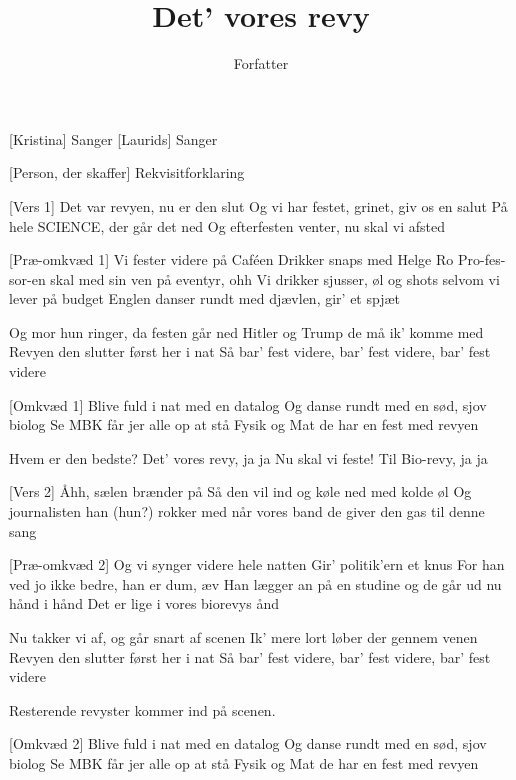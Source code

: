 \documentclass[a4paper,11pt]{article}
\title{Det' vores revy}
\author{Forfatter}
\begin{document}
\maketitle

\begin{roles}
    [Kristina] Sanger
    [Laurids] Sanger
\end{roles}

\begin{props}
    [Person, der skaffer] Rekvisitforklaring
\end{props}

\begin{song}
  [Vers 1] Det var revyen, nu er den slut
Og vi har festet, grinet, giv os en salut
På hele SCIENCE, der går det ned
Og efterfesten venter, nu skal vi afsted
 
  [Præ-omkvæd 1] Vi fester videre på Caféen
Drikker snaps med Helge Ro
Pro-fes-sor-en skal med sin ven på eventyr, ohh
Vi drikker sjusser, øl og shots
selvom vi lever på budget
Englen danser rundt med djævlen, gir’ et spjæt

   Og mor hun ringer, da festen går ned
Hitler og Trump de må ik’ komme med
Revyen den slutter først her i nat
Så bar’ fest videre, bar’ fest videre, bar’ fest videre
 
  [Omkvæd 1] Blive fuld i nat med en datalog
Og danse rundt med en sød, sjov biolog
Se MBK får jer alle op at stå
Fysik og Mat de har en fest med revyen

   Hvem er den bedste?
Det’ vores revy, ja ja
Nu skal vi feste!
Til Bio-revy, ja ja
 

  [Vers 2] Åhh, sælen brænder på
Så den vil ind og køle ned med kolde øl
Og journalisten han (hun?) rokker med
når vores band de giver den gas til denne sang

  [Præ-omkvæd 2] Og vi synger videre hele natten
Gir’ politik’ern et knus
For han ved jo ikke bedre, han er dum, æv
Han lægger an på en studine og de går ud nu hånd i hånd
Det er lige i vores biorevys ånd
 
   Nu takker vi af, og går snart af scenen
Ik’ mere lort løber der gennem venen
Revyen den slutter først her i nat
Så bar’ fest videre, bar’ fest videre, bar’ fest videre

\scene Resterende revyster kommer ind på scenen.
 
  [Omkvæd 2] Blive fuld i nat med en datalog
Og danse rundt med en sød, sjov biolog
Se MBK får jer alle op at stå
Fysik og Mat de har en fest med revyen
 

\end{song}
\end{document}
